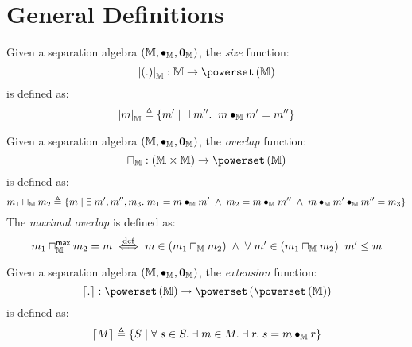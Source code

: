 \section*{General Definitions}
%
\begin{definition}
Given a separation algebra $\left(\mathbb{M}, \bullet_{\mathbb{M}}, \mathbf{0}_{\mathbb{M}} \right)$, the \emph{size} function:
%
\[
\size{\blankArg}{\mathbb{M}} : \mathbb{M} \rightarrow \pset{\mathbb{M}}
\]
%
is defined as:
%
\[
	\left\lvert m\right\rvert_{\mathbb{M}} \triangleq \left\{ m' \;|\; \exists\; m''.\;\; m \bullet_{\mathbb{M}} m' = m'' \right\}
\]
%
%
\end{definition}
%
%
\begin{definition}[Overlap]
Given a separation algebra $\left(\mathbb{M}, \bullet_{\mathbb{M}}, \mathbf{0}_{\mathbb{M}} \right)$, the \emph{overlap} function:
%
\[
\meet{\mathbb{M}} : \left(\mathbb{M} \times \mathbb{M} \right)\rightarrow \pset{\mathbb{M}}
\]
%
is defined as:
%
\[
	m_1 \sqcap_{\mathbb{M}} m_2 \triangleq \left\{ m \;|\; \exists\; m', m'', m_3.\; m_1 = m \bullet_{\mathbb{M}} m' \;\land\; m_2 = m \bullet_{\mathbb{M}} m'' \;\land\; m \bullet_{\mathbb{M}} m' \bullet_{\mathbb{M}} m'' = m_3 \right\}
\]
%
The \emph{maximal overlap} is defined as:
%
\[
	m_1 \sqcap_{\mathbb{M}}^{\textsf{max}} m_2 = m \stackrel{\mathrm{def}}{\iff} m \in (m_1 \sqcap_{\mathbb{M}} m_2) \;\land\; \forall\; m' \in (m_1 \sqcap_{\mathbb{M}} m_2).\; m' \leq m
\]
%
\end{definition}
%
%
%
%
\begin{definition}[Extension]
Given a separation algebra $\left(\mathbb{M}, \bullet_{\mathbb{M}}, \mathbf{0}_{\mathbb{M}} \right)$, the \emph{extension} function:
%
\[
\extend{.} : \pset{\mathbb{M}} \rightarrow \pset{\pset{\mathbb{M}}}
\]
%
is defined as:
%
\[
\begin{array}{l}
	\left\lceil M \right\rceil \triangleq \left\{S \;|\; \forall\; s \in S.\; \exists\; m \in M.\; \exists\; r.\; s = m \bullet_{\mathbb{M}} r \right\}
\end{array}
\]
%
\end{definition}

